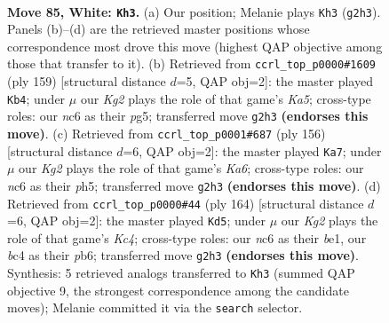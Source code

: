 \documentclass[11pt]{article}
\begin{document}
\clearpage

\begin{figure}[p]\centering
\begin{subfigure}{0.46\textwidth}\centering
\resizebox{\linewidth}{!}{%
\newchessgame
\chessboard[
  setfen={7k/8/2n5/8/2b2B2/8/5PK1/8 w - - 15 85},
  showmover=false,
  pgfstyle=straightmove, color=movearrow, markmove={g2-h3}
]}
\caption{}
\end{subfigure}\hfill
\begin{subfigure}{0.46\textwidth}\centering
\resizebox{\linewidth}{!}{%
\newchessgame
\chessboard[
  setfen={8/8/6b1/3K2P1/k7/1p6/1B6/8 b - - 7 80},
  showmover=false,
  pgfstyle=straightmove, color=movearrow, markmove={a4-b4}
]}
\caption{}
\end{subfigure}
\\[4pt]
\begin{subfigure}{0.46\textwidth}\centering
\resizebox{\linewidth}{!}{%
\newchessgame
\chessboard[
  setfen={8/8/KPb5/7p/3k4/7B/8/8 w - - 4 79},
  showmover=false,
  pgfstyle=straightmove, color=movearrow, markmove={a6-a7}
]}
\caption{}
\end{subfigure}\hfill
\begin{subfigure}{0.46\textwidth}\centering
\resizebox{\linewidth}{!}{%
\newchessgame
\chessboard[
  setfen={8/5k2/1p6/1P6/2K5/8/8/1B2b3 w - - 5 83},
  showmover=false,
  pgfstyle=straightmove, color=movearrow, markmove={c4-d5}
]}
\caption{}
\end{subfigure}
\caption{\textbf{Move 85, White: \texttt{Kh3}.} (a) Our position; Melanie plays \texttt{Kh3} (\texttt{g2h3}). Panels (b)--(d) are the retrieved master positions whose correspondence most drove this move (highest QAP objective among those that transfer to it). (b) Retrieved from \texttt{ccrl\_top\_p0000\#1609} (ply 159) [structural distance $d$=5, QAP obj=2]: the master played \texttt{Kb4}; under $\mu$ our \emph{Kg2} plays the role of that game's \emph{Ka5}; cross-type roles: our \emph{n}c6 as their \emph{p}g5; transferred move \texttt{g2h3} \textbf{(endorses this move)}. (c) Retrieved from \texttt{ccrl\_top\_p0001\#687} (ply 156) [structural distance $d$=6, QAP obj=2]: the master played \texttt{Ka7}; under $\mu$ our \emph{Kg2} plays the role of that game's \emph{Ka6}; cross-type roles: our \emph{n}c6 as their \emph{p}h5; transferred move \texttt{g2h3} \textbf{(endorses this move)}. (d) Retrieved from \texttt{ccrl\_top\_p0000\#44} (ply 164) [structural distance $d$=6, QAP obj=2]: the master played \texttt{Kd5}; under $\mu$ our \emph{Kg2} plays the role of that game's \emph{Kc4}; cross-type roles: our \emph{n}c6 as their \emph{b}e1, our \emph{b}c4 as their \emph{p}b6; transferred move \texttt{g2h3} \textbf{(endorses this move)}. Synthesis: 5 retrieved analogs transferred to \texttt{Kh3} (summed QAP objective 9, the strongest correspondence among the candidate moves); Melanie committed it via the \texttt{search} selector.}
\label{fig:thought-m168}
\end{figure}
\end{document}
